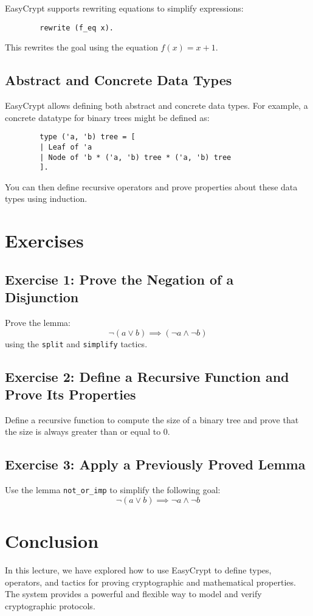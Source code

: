 \documentclass{article}
\begin{document}
	EasyCrypt supports rewriting equations to simplify expressions:
	\begin{verbatim}
		rewrite (f_eq x).
	\end{verbatim}
	This rewrites the goal using the equation \( f(x) = x + 1 \).
	
	\subsection{Abstract and Concrete Data Types}
	
	EasyCrypt allows defining both abstract and concrete data types. For example, a concrete datatype for binary trees might be defined as:
	\begin{verbatim}
		type ('a, 'b) tree = [
		| Leaf of 'a
		| Node of 'b * ('a, 'b) tree * ('a, 'b) tree
		].
	\end{verbatim}
	
	You can then define recursive operators and prove properties about these data types using induction.
	
	\section{Exercises}
	
	\subsection{Exercise 1: Prove the Negation of a Disjunction}
	Prove the lemma:
	\[
	\neg (a \lor b) \implies (\neg a \land \neg b)
	\]
	using the \texttt{split} and \texttt{simplify} tactics.
	
	\subsection{Exercise 2: Define a Recursive Function and Prove Its Properties}
	Define a recursive function to compute the size of a binary tree and prove that the size is always greater than or equal to 0.
	
	\subsection{Exercise 3: Apply a Previously Proved Lemma}
	Use the lemma \texttt{not\_or\_imp} to simplify the following goal:
	\[
	\neg (a \lor b) \implies \neg a \land \neg b
	\]
	
	\section{Conclusion}
	
	In this lecture, we have explored how to use EasyCrypt to define types, operators, and tactics for proving cryptographic and mathematical properties. The system provides a powerful and flexible way to model and verify cryptographic protocols.
	
\end{document}
